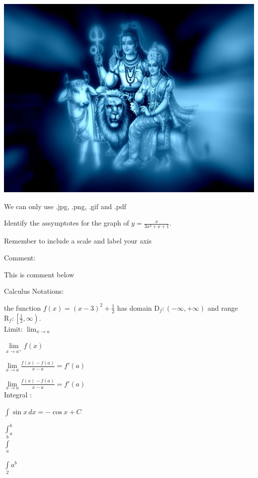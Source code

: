 \documentclass[11pt]{article}
\def\eq1{y = \frac{x}{3x^2+x+1}}
\def\labelaxis{Remember to include a scale and label your axis}
\begin{document}
\begin{center}
\includegraphics[scale = 0.25, angle = 45]{last.jpg}

We can only use .jpg, .png, .gif and .pdf
\end{center}

Identify the assymptotes for the graph of $\eq1$.

\labelaxis

Comment:

This is comment below




Calculus Notations:

the function $f(x) = (x-3)^2+\frac{1}{2}$ has domain $\mathrm{D}_f:(-\infty, +\infty)$ and range $\mathrm{R}_f:\left[\frac{1}{2},\infty\right)$. \\

Limit:
$\lim _{x \to a}$

$\lim \limits_{x \to a^+}f(x)$ %

$\lim \limits_{x \to a}\frac{f(x)-f(a)}{x-a} = f'(a)$

$\displaystyle{\lim \limits_{x \to a}\frac{f(x)-f(a)}{x-a} = f'(a)}$ \\

Integral : 

$\displaystyle{\int \sin x \, dx = - \cos x + C}$

$\displaystyle{\int_a^b}$\\

$\displaystyle{\int \limits_a^b}$

$\displaystyle{\int \limits_2a^b}$
\end{document}
